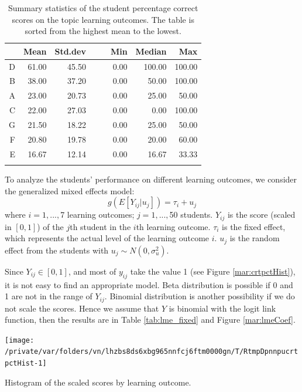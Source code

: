 \documentclass[12pt,english,nohyper]{tufte-handout}\usepackage[]{graphicx}\usepackage[]{color}
\newenvironment{knitrout}{}{} %
\begin{document}
\begin{longtable}{rrrllrrr}
  \hline
 & Mean & Std.dev &   &   & Min & Median & Max \\ 
  \hline
D & 61.00 & 45.50 &  &  & 0.00 & 100.00 & 100.00 \\ 
  B & 38.00 & 37.20 &  &  & 0.00 & 50.00 & 100.00 \\ 
  A & 23.00 & 20.73 &  &  & 0.00 & 25.00 & 50.00 \\ 
  C & 22.00 & 27.03 &  &  & 0.00 & 0.00 & 100.00 \\ 
  G & 21.50 & 18.22 &  &  & 0.00 & 25.00 & 50.00 \\ 
  F & 20.80 & 19.78 &  &  & 0.00 & 20.00 & 60.00 \\ 
  E & 16.67 & 12.14 &  &  & 0.00 & 16.67 & 33.33 \\ 
   \hline
\hline
\caption{Summary statistics of the student percentage correct scores on the topic learning outcomes. The table is sorted from the highest mean to the lowest.} 
\label{tab:LearningObj_summary}
\end{longtable}






To analyze the students' performance on different learning outcomes, we consider the generalized mixed effects model:
\[
g(E[Y_{ij}|u_{j}])= \tau_{i}+u_{j}
\]
where $i=1,...,$7 learning outcomes;
$j=1,...,$50 students. $Y_{ij}$ is the score (scaled in $[0,1]$) of
the $j$th student in the $i$th learning outcome. $\tau_i$ is the fixed effect,
which represents the actual level of the learning outcome $i$.
$u_j$ is the random effect from the students with
$u_{j} \sim N(0,\sigma_{u}^{2})$.

Since $Y_{ij} \in [0,1]$, and most of $y_{ij}$ take the value 1
(see Figure \ref{mar:crtpctHist}), it is not easy to find an appropriate model.
Beta distribution is possible if 0 and 1 are not in the range of $Y_{ij}$.
Binomial distribution is another possibility if we do not scale the scores.
Hence we assume that $Y$ is binomial with the logit link function,
then the results are in Table \ref{tab:lme_fixed} and Figure \ref{mar:lmeCoef}.

\begin{knitrout}
\color{fgcolor}\begin{marginfigure}
\texttt{[image: /private/var/folders/vn/lhzbs8ds6xbg965nnfcj6ftm0000gn/T/RtmpDpnnpucrtpctHist-1]} \caption[Histogram of the scaled scores by learning outcome]{Histogram of the scaled scores by learning outcome.}\label{mar:crtpctHist}
\end{marginfigure}


\end{knitrout}
\end{document}
